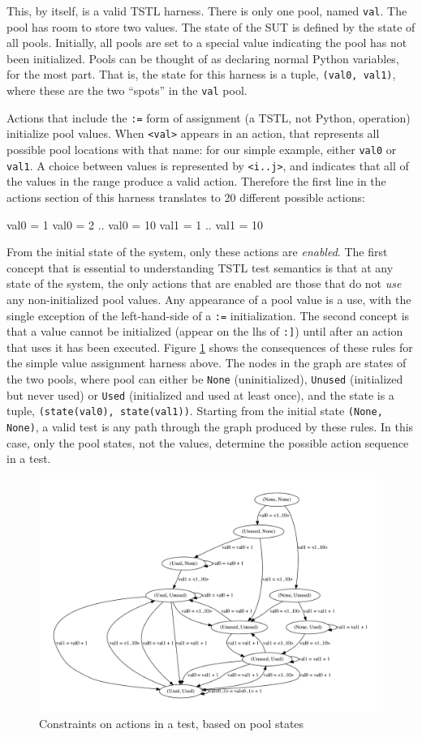 This, by itself, is a valid TSTL harness.  There is only one pool,
named {\tt val}.  The pool has room to store two values.  The state of
the SUT is defined by the state of all pools.  Initially, all pools
are set to a special value indicating the pool has not been
initialized.  Pools can be thought of as declaring normal Python
variables, for the most part.  That is, the state for this harness is
a tuple, {\tt (val0, val1)}, where these are the two ``spots'' in the
{\tt val} pool.

Actions that include the {\tt :=} form of assignment (a TSTL, not
Python, operation) initialize pool values.  When {\tt <val>} appears
in an action, that represents all possible pool locations with that
name:  for our simple example, either {\tt val0} or {\tt val1}.  A
choice between values is represented by {\tt <i..j>}, and indicates
that all of the values in the range produce a valid action.  Therefore
the first line in the actions section of this harness translates to 20
different possible actions:

{\scriptsize
\begin{code}
val0 = 1
val0 = 2
..
val0 = 10
val1 = 1
..
val1 = 10
\end{code}
}

From the initial state of the system, only these actions are
\emph{enabled}.  The first concept that is essential to understanding
TSTL test semantics is that at any state of the
system, the only actions that are enabled are those that do not
\emph{use} any non-initialized pool values.  Any appearance of a pool
value is a use, with the single exception of the left-hand-side of a
{\tt :=} initialization.  The second concept is that a value
cannot be initialized (appear on the lhs of {\tt :]}) until after an action
that uses it has been executed.  Figure \ref{fig:poolacts} shows the
consequences of these rules for the simple value assignment harness
above.  The nodes in the graph are states of the two pools, where pool
can either be {\tt None} (uninitialized), {\tt Unused} (initialized
but never used) or {\tt Used} (initialized and used at least once),
and the state is a tuple, {\tt (state(val0), state(val1))}.
Starting from the initial state {\tt (None, None)}, a valid test is any path
through the graph produced by these rules.  In this case, only
the pool states, not the values, determine the possible action
sequence in a test.  

\begin{figure}
\includegraphics[width=\columnwidth]{states}
\caption{Constraints on actions in a test, based on pool states}
\label{fig:poolacts}
\end{figure}